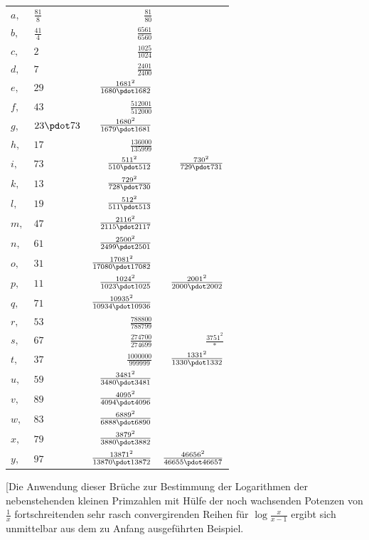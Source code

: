 \begin{longtable}{@{}llrr@{}}
$a,$ & $\frac{81}{8}$ & $\frac{81}{80}$ & \\
$b,$ & $\frac{41}{4}$ & $\frac{6561}{6560}$ & \\
$c,$ & $2$ & $\frac{1025}{1024}$ & \\
$d,$ & $7$ & $\frac{2401}{2400}$ & \\
$e,$ & $29$ & $\frac{1681^2}{1680\pdot 1682}$ & \\
$f,$ & $43$ & $\frac{512001}{512000}$ & \\
$g,$ & $23\pdot 73$ & $\frac{1680^2}{1679\pdot 1681}$ & \\
$h,$ & $17$ & $\frac{136000}{135999}$ & \\
$i,$ & $73$ & $\frac{511^2}{510\pdot 512}$ &  $\frac{730^2}{729\pdot 731}$\\
$k,$ & $13$ & $\frac{729^2}{728\pdot 730}$ & \\
$l,$ & $19$ & $\frac{512^2}{511\pdot 513}$ & \\
$m,$ & $47$ & $\frac{2116^2}{2115\pdot 2117}$ & \\
$n,$ & $61$ & $\frac{2500^2}{2499\pdot 2501}$ & \\
$o,$ & $31$ & $\frac{17081^2}{17080\pdot 17082}$ & \\
$p,$ & $11$ & $\frac{1024^2}{1023\pdot 1025}$ &  $\frac{2001^2}{2000\pdot 2002}$\\
$q,$ & $71$ & $\frac{10935^2}{10934\pdot 10936}$ & \\
$r,$ & $53$ & $\frac{788800}{788799}$ & \\
$s,$ & $67$ & $\frac{274700}{274699}$ &  $\frac{3751^2}{*}$\\
$t,$ & $37$ & $\frac{1000000}{999999}$ &  $\frac{1331^2}{1330\pdot 1332}$\\
$u,$ & $59$ & $\frac{3481^2}{3480\pdot 3481}$ & \\
$v,$ & $89$ & $\frac{4095^2}{4094\pdot 4096}$ & \\
$w,$ & $83$ & $\frac{6889^2}{6888\pdot 6890}$ & \\
$x,$ & $79$ & $\frac{3879^2}{3880\pdot 3882}$ & \\
$y,$ & $97$ & $\frac{13871^2}{13870\pdot 13872}$ &  $\frac{46656^2}{46655\pdot 46657}$\\
\end{longtable}\endgroup
[Die Anwendung dieser Brüche zur Bestimmung der Logarithmen der nebenstehenden kleinen Primzahlen mit Hülfe der noch wachsenden Potenzen von $\frac1x$ fortschreitenden sehr rasch convergirenden Reihen für $\log\frac{x}{x-1}$ ergibt sich unmittelbar aus dem zu Anfang ausgeführten Beispiel.\par
